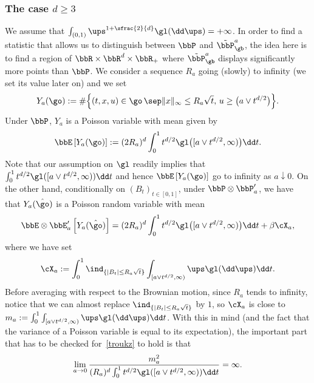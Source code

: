 \subsubsection{The case $d\ge 3$}
We assume that
$\int_{(0,1)} \ups^{1+\sfrac{2}{d}} \gl(\dd \ups)=+\infty$.
In order to find a statistic that allows us to distinguish between $\bbP$ and $\tilde \bbP^{a}_{\gb}$,
the idea here is to find a region of $\bbR\times \bbR^d\times \bbR_+$ where $\tilde \bbP^{a}_{\gb}$
displays significantly more points than $\bbP$.
We consider a sequence $R_a$ going (slowly) to infinity (we set its value later on)
and we set
\begin{equation}
Y_a(\go) := \#\Bigl\{ (t,x,u) \in \go \, \sep \|x\|_\infty \le R_a\sqrt{t},\, u\ge \bigl(a\vee t^{d/2} \bigr)\Bigr\}.
\end{equation}
Under $\bbP$, $Y_a$ is a Poisson variable with mean given by
\begin{equation}
\label{eq:meanNa}
\bbE\left[ Y_a(\go)\right]:= (2R_a)^d \int^1_0 t^{d/2} \gl\bigl([a\vee t^{d/2}, \infty) \bigr)\dd t.
\end{equation}
Note that our assumption on $\gl$ readily implies that $\int^1_0 t^{d/2} \gl([a\vee t^{d/2}, \infty))\dd t$ and hence $\bbE\left[ Y_a(\go)\right]$ go to infinity as $a\downarrow 0$.
On the other hand, conditionally on $(B_t)_{t\in[0,1]}$, under $\bbP\otimes \bbP'_a$, we have that $Y_a(\hat \go)$ is a Poisson random variable
with mean
\begin{equation}\label{condipoisson}
\bbE\otimes \bbE'_a\left[ Y_a(\hat \go)\right]= (2R_a)^d\int^1_0 t^{d/2} \gl \bigl([a\vee t^{d/2}, \infty) \bigr)\dd t+ \beta \cX_a,
\end{equation}
where we have set
\begin{equation}
\cX_a:=\int^1_0 \ind_{\{|B_t|\leq R_a \sqrt{t}\}} \int_{[a\vee t^{d/2}, \infty)} \ups \gl(\dd \ups) \dd t.
\end{equation}
Before averaging with respect to the Brownian motion, since $R_a$ tends to infinity, notice that we can almost replace $\ind_{\{|B_t|\le R_a \sqrt{t}\}}$ by $1$, so $\cX_a$
is close to $m_a:=\int^1_0 \int_{[a\vee t^{d/2}, \infty)} \ups \gl(\dd \ups) \dd t$. With this in mind (and the fact that the variance of a Poisson variable is equal to its expectation),
the important part that has to be checked for~\eqref{troukz} to hold is that
\begin{equation}\label{keything}
\lim_{a\to 0}\frac{ m_a^2 }{(R_a)^d \int^1_0 t^{d/2} \gl([a\vee t^{d/2}, \infty))\dd t}=\infty.
\end{equation}
